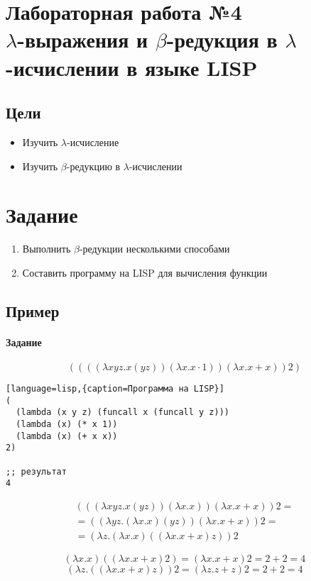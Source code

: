 \documentclass[a4paper,12pt]{article}
\begin{document}
\newpage
\section{Лабораторная работа №4 \\ 
	$\lambda$-выражения и $\beta$-редукция в $\lambda$-исчислении в языке LISP}
\subsection{Цели}
\begin{itemize}
	\item Изучить $\lambda$-исчисление
	\item Изучить $\beta$-редукцию в $\lambda$-исчислении
\end{itemize}

\section{Задание}
\begin{enumerate}
	\item Выполнить $\beta$-редукции несколькими способами
	\item Составить программу на LISP для вычисления функции
\end{enumerate}

\subsection{Пример}
\paragraph{Задание}
\[((((\lambda xyz.x(yz))(\lambda x.x\cdot 1))(\lambda x.x+x))2)\]

\begin{lstlisting}[language=lisp,{caption=Программа на LISP}]
( 
  (lambda (x y z) (funcall x (funcall y z))) 
  (lambda (x) (* x 1)) 
  (lambda (x) (+ x x)) 
2)

;; результат
4
\end{lstlisting}

\begin{align*}
(((\lambda xyz.x(yz))(\lambda x.x))(\lambda x.x+x))2=\\
=((\lambda yz.(\lambda x.x)(yz))(\lambda x.x+x))2 =\\
=(\lambda z.(\lambda x.x)((\lambda x.x+x)z))2
\end{align*}

\[(\lambda x.x)((\lambda x.x+x)2)=(\lambda x.x+x)2=2+2=4\]
\[(\lambda z.((\lambda x.x+x)z))2=(\lambda z.z+z)2=2+2=4\]
\end{document}
